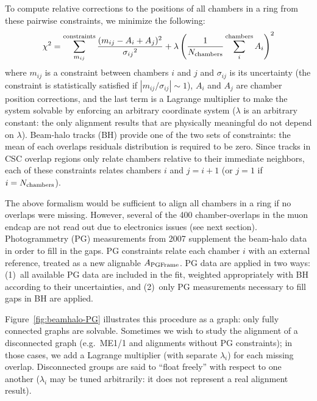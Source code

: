 \documentclass[12pt]{article}
\newcommand{\s}[1]{{\mbox{\scriptsize #1}}}
\begin{document}
To compute relative corrections to the positions of all chambers in a
ring from these pairwise constraints, we minimize the following:
\begin{equation}
\chi^2 = \sum_{m_{ij}}^\s{constraints} \frac{(m_{ij} - A_i +
  A_j)^2}{{\sigma_{ij}}^2} + \lambda \left(\frac{1}{N_\s{chambers}} \sum_i^\s{chambers}A_i\right)^2
\label{eqn:minimizeme}
\end{equation}
where $m_{ij}$ is a constraint between chambers $i$ and $j$ and
$\sigma_{ij}$ is its uncertainty (the constraint is statistically
satisfied if $|m_{ij}/\sigma_{ij}| \sim 1$), $A_i$ and $A_j$ are
chamber position corrections, and the last term is a Lagrange
multiplier to make the system solvable by enforcing an arbitrary
coordinate system ($\lambda$ is an arbitrary constant: the only
alignment results that are physically meaningful do not depend on $\lambda$).
Beam-halo tracks (BH) provide one of the two sets of constraints: the
mean of each overlaps residuals distribution is required to be zero.
Since tracks in CSC overlap regions only relate chambers relative to
their immediate neighbors, each of these constraints relates chambers
$i$ and $j=i+1$ (or $j=1$ if $i=N_\s{chambers}$).

The above formalism would be sufficient to align all chambers in a
ring if no overlaps were missing.  However, several of the 400
chamber-overlaps in the muon endcap are not read out due to
electronics issues (see next section).  Photogrammetry (PG)
measurements from 2007 supplement the beam-halo data in order to fill
in the gaps.  PG constraints relate each chamber $i$ with an external
reference, treated as a new alignable $A_\s{PGFrame}$.  PG data are
applied in two ways: (1)~all available PG data are included in the
fit, weighted appropriately with BH according to their uncertainties,
and (2)~only PG measurements necessary to fill gaps in BH are applied.

Figure~\ref{fig:beamhalo-PG} illustrates this procedure as a graph:
only fully connected graphs are solvable.  Sometimes we wish to study
the alignment of a disconnected graph (e.g.\ ME1/1 and alignments
without PG constraints); in those cases, we add a Lagrange multiplier
(with separate $\lambda_i$) for each missing overlap.  Disconnected
groups are said to ``float freely'' with respect to one another
($\lambda_i$ may be tuned arbitrarily: it does not represent a real
alignment result).
\end{document}
